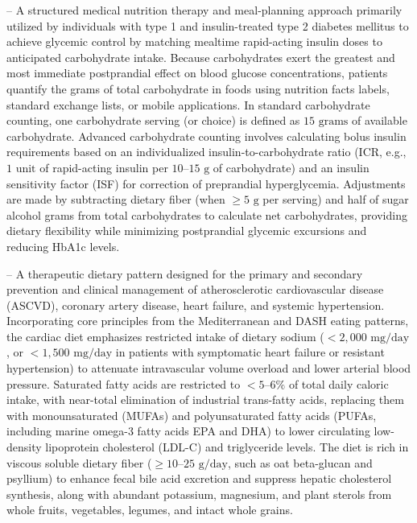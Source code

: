 -- A structured medical nutrition therapy and meal-planning approach primarily utilized by individuals with type 1 and insulin-treated type 2 diabetes mellitus to achieve glycemic control by matching mealtime rapid-acting insulin doses to anticipated carbohydrate intake. Because carbohydrates exert the greatest and most immediate postprandial effect on blood glucose concentrations, patients quantify the grams of total carbohydrate in foods using nutrition facts labels, standard exchange lists, or mobile applications. In standard carbohydrate counting, one carbohydrate serving (or choice) is defined as $15\text{ grams}$ of available carbohydrate. Advanced carbohydrate counting involves calculating bolus insulin requirements based on an individualized insulin-to-carbohydrate ratio (ICR, e.g., $1\text{ unit}$ of rapid-acting insulin per $10\text{--}15\text{ g}$ of carbohydrate) and an insulin sensitivity factor (ISF) for correction of preprandial hyperglycemia. Adjustments are made by subtracting dietary fiber (when $\ge 5\text{ g}$ per serving) and half of sugar alcohol grams from total carbohydrates to calculate net carbohydrates, providing dietary flexibility while minimizing postprandial glycemic excursions and reducing HbA1c levels.

-- A therapeutic dietary pattern designed for the primary and secondary prevention and clinical management of atherosclerotic cardiovascular disease (ASCVD), coronary artery disease, heart failure, and systemic hypertension. Incorporating core principles from the Mediterranean and DASH eating patterns, the cardiac diet emphasizes restricted intake of dietary sodium ($<2{,}000\text{ mg/day}$, or $<1{,}500\text{ mg/day}$ in patients with symptomatic heart failure or resistant hypertension) to attenuate intravascular volume overload and lower arterial blood pressure. Saturated fatty acids are restricted to $<5\text{--}6\%$ of total daily caloric intake, with near-total elimination of industrial trans-fatty acids, replacing them with monounsaturated (MUFAs) and polyunsaturated fatty acids (PUFAs, including marine omega-3 fatty acids EPA and DHA) to lower circulating low-density lipoprotein cholesterol (LDL-C) and triglyceride levels. The diet is rich in viscous soluble dietary fiber ($\ge 10\text{--}25\text{ g/day}$, such as oat beta-glucan and psyllium) to enhance fecal bile acid excretion and suppress hepatic cholesterol synthesis, along with abundant potassium, magnesium, and plant sterols from whole fruits, vegetables, legumes, and intact whole grains.

